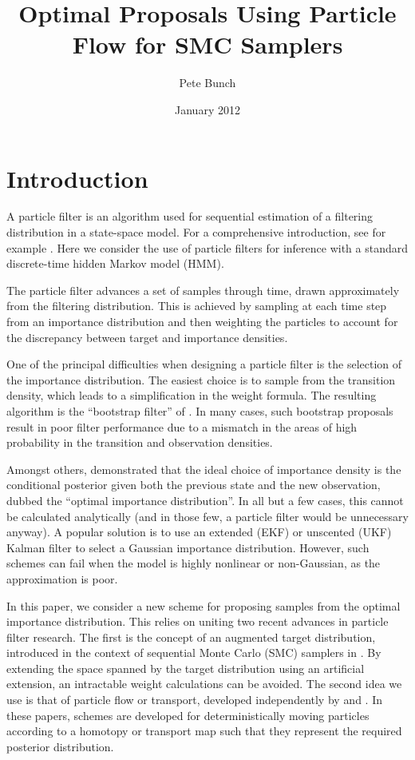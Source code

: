 \documentclass{article}
\title{Optimal Proposals Using Particle Flow for SMC Samplers}
\author{Pete Bunch}
\date{January 2012}
\begin{document}
\maketitle

\section{Introduction}

A particle filter is an algorithm used for sequential estimation of a filtering distribution in a state-space model. For a comprehensive introduction, see for example \cite{Cappe2007,Doucet2009}. Here we consider the use of particle filters for inference with a standard discrete-time hidden Markov model (HMM).

The particle filter advances a set of samples through time, drawn approximately from the filtering distribution. This is achieved by sampling at each time step from an importance distribution and then weighting the particles to account for the discrepancy between target and importance densities.

One of the principal difficulties when designing a particle filter is the selection of the importance distribution. The easiest choice is to sample from the transition density, which leads to a simplification in the weight formula. The resulting algorithm is the ``bootstrap filter'' of \cite{Gordon1993}. In many cases, such bootstrap proposals result in poor filter performance due to a mismatch in the areas of high probability in the transition and observation densities.

Amongst others, \cite{Doucet2000a} demonstrated that the ideal choice of importance density is the conditional posterior given both the previous state and the new observation, dubbed the ``optimal importance distribution''. In all but a few cases, this cannot be calculated analytically (and in those few, a particle filter would be unnecessary anyway). A popular solution is to use an extended (EKF) or unscented (UKF) Kalman filter to select a Gaussian importance distribution. However, such schemes can fail when the model is highly nonlinear or non-Gaussian, as the approximation is poor.

In this paper, we consider a new scheme for proposing samples from the optimal importance distribution. This relies on uniting two recent advances in particle filter research. The first is the concept of an augmented target distribution, introduced in the context of sequential Monte Carlo (SMC) samplers in \cite{DelMoral2006}. By extending the space spanned by the target distribution using an artificial extension, an intractable weight calculations can be avoided. The second idea we use is that of particle flow or transport, developed independently by \cite{Daum2008,Daum2011d} and \cite{Reich2011}. In these papers, schemes are developed for deterministically moving particles according to a homotopy or transport map such that they represent the required posterior distribution.
\end{document}
